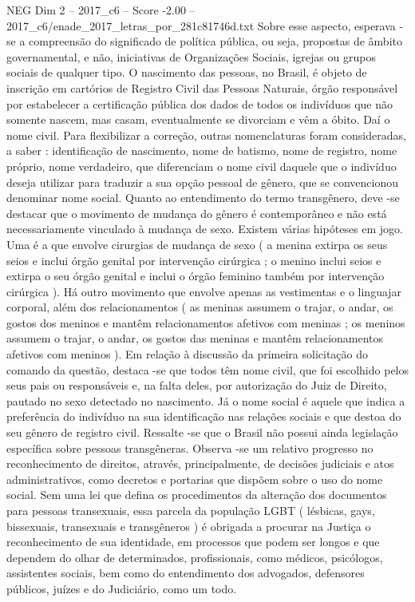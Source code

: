 \begin{textsample}{NEG Dim 2 – 2017\_c6 – Score -2.00 – 2017\_c6/enade\_2017\_letras\_por\_281c81746d.txt}
Sobre esse aspecto, esperava -se a compreensão do significado de política pública, ou seja, propostas de âmbito governamental, e não, iniciativas de Organizações Sociais, igrejas ou grupos sociais de qualquer tipo.
O nascimento das pessoas, no Brasil, é objeto de inscrição em cartórios de Registro Civil das Pessoas Naturais, órgão responsável por estabelecer a certificação pública dos dados de todos os indivíduos que não somente nascem, mas casam, eventualmente se divorciam e vêm a óbito.
Daí o nome civil.
Para flexibilizar a correção, outras nomenclaturas foram consideradas, a saber : identificação de nascimento, nome de batismo, nome de registro, nome próprio, nome verdadeiro, que diferenciam o nome civil daquele que o indivíduo deseja utilizar para traduzir a sua opção pessoal de gênero, que se convencionou denominar nome social.
Quanto ao entendimento do termo transgênero, deve -se destacar que o movimento de mudança do gênero é contemporâneo e não está necessariamente vinculado à mudança de sexo.
Existem várias hipóteses em jogo.
Uma é a que envolve cirurgias de mudança de sexo ( a menina extirpa os seus seios e inclui órgão genital por intervenção cirúrgica ; o menino inclui seios e extirpa o seu órgão genital e inclui o órgão feminino também por intervenção cirúrgica ).
Há outro movimento que envolve apenas as vestimentas e o linguajar corporal, além dos relacionamentos ( as meninas assumem o trajar, o andar, os gostos dos meninos e mantêm relacionamentos afetivos com meninas ; os meninos assumem o trajar, o andar, os gostos das meninas e mantêm relacionamentos afetivos com meninos ).
Em relação à discussão da primeira solicitação do comando da questão, destaca -se que todos têm nome civil, que foi escolhido pelos seus pais ou responsáveis e, na falta deles, por autorização do Juiz de Direito, pautado no sexo detectado no nascimento.
Já o nome social é aquele que indica a preferência do indivíduo na sua identificação nas relações sociais e que destoa do seu gênero de registro civil.
Ressalte -se que o Brasil não possui ainda legislação específica sobre pessoas transgêneras.
Observa -se um relativo progresso no reconhecimento de direitos, através, principalmente, de decisões judiciais e atos administrativos, como decretos e portarias que dispõem sobre o uso do nome social.
Sem uma lei que defina os procedimentos da alteração dos documentos para pessoas transexuais, essa parcela da população LGBT ( lésbicas, gays, bissexuais, transexuais e transgêneros ) é obrigada a procurar na Justiça o reconhecimento de sua identidade, em processos que podem ser longos e que dependem do olhar de determinados, profissionais, como médicos, psicólogos, assistentes sociais, bem como do entendimento dos advogados, defensores públicos, juízes e do Judiciário, como um todo.

\end{textsample}
